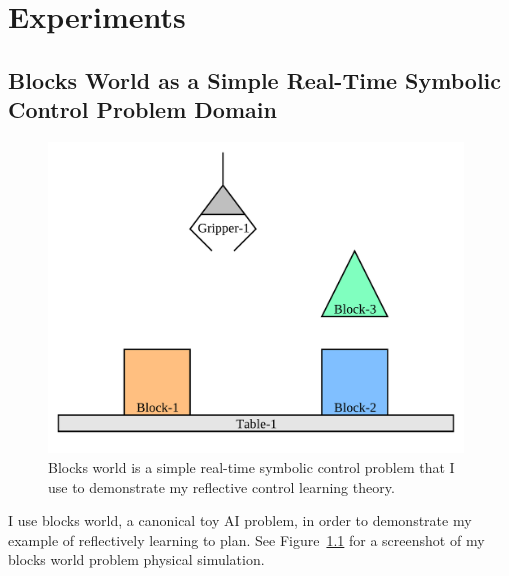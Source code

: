 \chapter{Experiments}\label{ch:experiments}

\section{Blocks World as a Simple Real-Time Symbolic Control Problem Domain}

\begin{figure}[bth]
  \center
  \includegraphics[width=11cm]{gfx/blocks_world_screenshot-1}
  \caption[Blocks world is a simple real-time symbolic control problem.]{Blocks world is a simple real-time symbolic control problem that I use to demonstrate my reflective control learning theory.}
  \label{fig:blocks_world_screenshot-1}
\end{figure}

I use blocks world, a canonical toy AI problem, in order to demonstrate my example of reflectively learning to plan.
See Figure~\ref{fig:blocks_world_screenshot-1} for a screenshot of my blocks world problem physical simulation.


